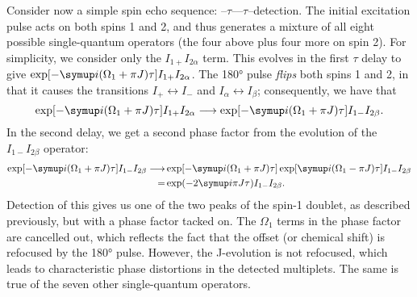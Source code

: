 Consider now a simple spin echo sequence: --$\tau$----$\tau$--detection.
The initial excitation pulse acts on both spins 1 and 2, and thus generates a mixture of all eight possible single-quantum operators (the four above plus four more on spin 2).
For simplicity, we consider only the $I_{1+}I_{2\alpha}$ term.
This evolves in the first $\tau$ delay to give $\exp[-\mi(\Omega_1 + \pi J)\tau] I_{1+}I_{2\alpha}$.
The \ang{180} pulse \textit{flips} both spins 1 and 2, in that it causes the transitions $I_+ \leftrightarrow I_-$ and $I_\alpha \leftrightarrow I_\beta$; consequently, we have that
\begin{equation}
    \label{eq:spin_echo_1}
    \exp[-\mi(\Omega_1 + \pi J)\tau] I_{1+}I_{2\alpha} \longrightarrow \exp[-\mi(\Omega_1 + \pi J)\tau] I_{1-}I_{2\beta}.
\end{equation}
In the second delay, we get a second phase factor from the evolution of the $I_{1-}I_{2\beta}$ operator:
\begin{align}
    \label{eq:spin_echo_2}
    \exp[-\mi(\Omega_1 + \pi J)\tau] I_{1-}I_{2\beta} \longrightarrow
    &\exp[-\mi(\Omega_1 + \pi J)\tau] \exp[\mi(\Omega_1 - \pi J)\tau] I_{1-}I_{2\beta} \notag \\
    = &\exp(-2\mi \pi J\tau) I_{1-}I_{2\beta}.
\end{align}
Detection of this gives us one of the two peaks of the spin-1 doublet, as described previously, but with a phase factor tacked on.
The $\Omega_1$ terms in the phase factor are cancelled out, which reflects the fact that the offset (or chemical shift) is refocused by the \ang{180} pulse.
However, the J-evolution is not refocused, which leads to characteristic phase distortions in the detected multiplets.
The same is true of the seven other single-quantum operators.

